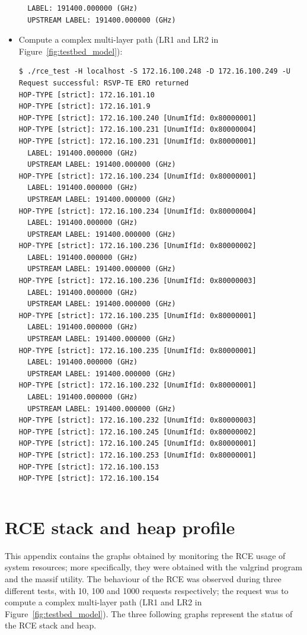 \documentclass[10pt,a4paper]{report}
\begin{document}
\begin{itemize}
{{\begin{verbatim}
  LABEL: 191400.000000 (GHz)
  UPSTREAM LABEL: 191400.000000 (GHz)
\end{verbatim}
}}
\newpage
\item{Compute a complex multi-layer path (LR1 and LR2 in
    Figure~\ref{fig:testbed_model}): {\small
\begin{verbatim}
$ ./rce_test -H localhost -S 172.16.100.248 -D 172.16.100.249 -U
Request successful: RSVP-TE ERO returned
HOP-TYPE [strict]: 172.16.101.10
HOP-TYPE [strict]: 172.16.101.9
HOP-TYPE [strict]: 172.16.100.240 [UnumIfId: 0x80000001]
HOP-TYPE [strict]: 172.16.100.231 [UnumIfId: 0x80000004]
HOP-TYPE [strict]: 172.16.100.231 [UnumIfId: 0x80000001]
  LABEL: 191400.000000 (GHz)
  UPSTREAM LABEL: 191400.000000 (GHz)
HOP-TYPE [strict]: 172.16.100.234 [UnumIfId: 0x80000001]
  LABEL: 191400.000000 (GHz)
  UPSTREAM LABEL: 191400.000000 (GHz)
HOP-TYPE [strict]: 172.16.100.234 [UnumIfId: 0x80000004]
  LABEL: 191400.000000 (GHz)
  UPSTREAM LABEL: 191400.000000 (GHz)
HOP-TYPE [strict]: 172.16.100.236 [UnumIfId: 0x80000002]
  LABEL: 191400.000000 (GHz)
  UPSTREAM LABEL: 191400.000000 (GHz)
HOP-TYPE [strict]: 172.16.100.236 [UnumIfId: 0x80000003]
  LABEL: 191400.000000 (GHz)
  UPSTREAM LABEL: 191400.000000 (GHz)
HOP-TYPE [strict]: 172.16.100.235 [UnumIfId: 0x80000001]
  LABEL: 191400.000000 (GHz)
  UPSTREAM LABEL: 191400.000000 (GHz)
HOP-TYPE [strict]: 172.16.100.235 [UnumIfId: 0x80000001]
  LABEL: 191400.000000 (GHz)
  UPSTREAM LABEL: 191400.000000 (GHz)
HOP-TYPE [strict]: 172.16.100.232 [UnumIfId: 0x80000001]
  LABEL: 191400.000000 (GHz)
  UPSTREAM LABEL: 191400.000000 (GHz)
HOP-TYPE [strict]: 172.16.100.232 [UnumIfId: 0x80000003]
HOP-TYPE [strict]: 172.16.100.245 [UnumIfId: 0x80000002]
HOP-TYPE [strict]: 172.16.100.245 [UnumIfId: 0x80000001]
HOP-TYPE [strict]: 172.16.100.253 [UnumIfId: 0x80000001]
HOP-TYPE [strict]: 172.16.100.153
HOP-TYPE [strict]: 172.16.100.154
\end{verbatim}
}}
\end{itemize}

{\small
\begin{verbatim}
\end{verbatim}
}

\chapter{RCE stack and heap profile}
This appendix contains the graphs obtained by monitoring the RCE usage
of system resources; more specifically, they were obtained with the
valgrind program and the massif utility. The behaviour of the RCE was
observed during three different tests, with 10, 100 and 1000 requests
respectively; the request was to compute a complex multi-layer path
(LR1 and LR2 in Figure~\ref{fig:testbed_model}). The three following
graphs represent the status of the RCE stack and heap.
\end{document}
